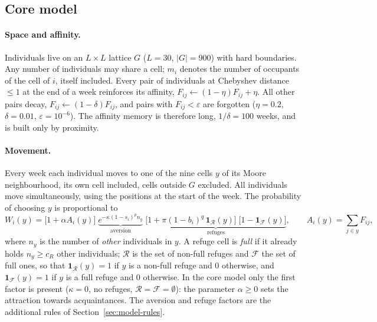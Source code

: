 \subsection{Core model}
\label{sec:model-baseline}

\paragraph{Space and affinity.}
Individuals live on an $L\times L$ lattice $G$ ($L=30$, $|G|=900$) with hard boundaries. Any number of
individuals may share a cell; $m_i$ denotes the number of occupants of the cell of $i$, itself included.
Every pair of individuals at Chebyshev distance $\le1$ at the end of a week reinforces its affinity,
$F_{ij}\leftarrow(1-\eta)F_{ij}+\eta$. All other pairs decay, $F_{ij}\leftarrow(1-\delta)F_{ij}$, and pairs
with $F_{ij}<\varepsilon$ are forgotten ($\eta=0.2$, $\delta=0.01$, $\varepsilon=10^{-6}$). The affinity
memory is therefore long, $1/\delta=100$ weeks, and is built only by proximity.

\paragraph{Movement.}
Every week each individual moves to one of the nine cells $y$ of its Moore neighbourhood, its own cell
included, cells outside $G$ excluded. All individuals move simultaneously, using the positions at the
start of the week. The probability of choosing $y$ is proportional to
\begin{equation}
  W_i(y)=\bigl[1+\alpha A_i(y)\bigr]\;
         \underbrace{e^{-\kappa(1-s_i)^{p}n_y}}_{\text{aversion}}\;
         \underbrace{\bigl[1+\pi(1-b_i)^{q}\,\mathbf 1_{\mathcal R}(y)\bigr]\;
         \bigl[1-\mathbf 1_{\mathcal F}(y)\bigr]}_{\text{refuges}},
  \qquad A_i(y)=\sum_{j\in y}F_{ij},
  \label{eq:model-move}
\end{equation}
where $n_y$ is the number of \emph{other} individuals in $y$. A refuge cell is \emph{full} if it already holds
$n_y\ge c_R$ other individuals; $\mathcal R$ is the set of non-full refuges and $\mathcal F$ the set of full ones, so
that $\mathbf 1_{\mathcal R}(y)=1$ if $y$ is a non-full refuge and 0 otherwise, and $\mathbf 1_{\mathcal F}(y)=1$ if
$y$ is a full refuge and 0 otherwise.
In the core model only the first factor is present ($\kappa=0$, no refuges, $\mathcal R=\mathcal F=\emptyset$): the parameter
$\alpha\ge0$ sets the attraction towards acquaintances. The aversion and refuge factors are the
additional rules of Section~\ref{sec:model-rules}.

